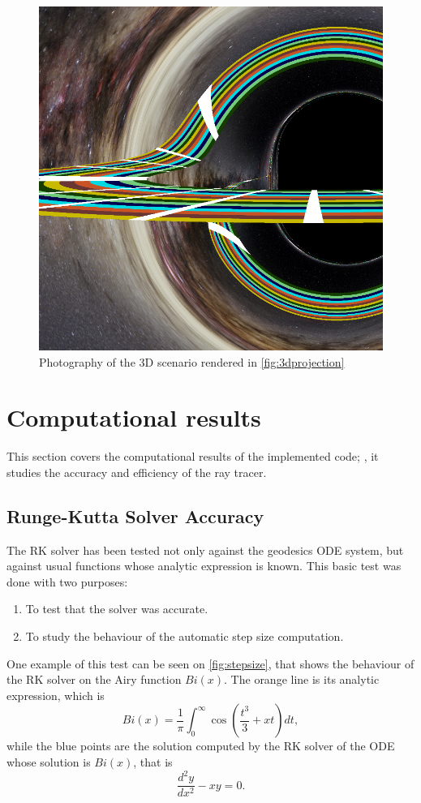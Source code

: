 \begin{figure}[bth]
	\myfloatalign
	\includegraphics[width=.7\linewidth]{gfx/3d_01_image}
	\caption[Photography from a 3D scenario]{Photography of the 3D scenario rendered in \autoref{fig:3dprojection}}
	\label{fig:3dprojectionimage}
\end{figure}

\section{Computational results}

This section covers the computational results of the implemented code; \ie, it studies the accuracy and efficiency of the ray tracer.

\subsection{Runge-Kutta Solver Accuracy}

The \ac{RK} solver has been tested not only against the geodesics \ac{ODE} system, but against usual functions whose analytic expression is known. This basic test was done with two purposes:
\begin{enumerate}
	\item To test that the solver was accurate.
	\item To study the behaviour of the automatic step size computation.
\end{enumerate}

One example of this test can be seen on \autoref{fig:stepsize}, that shows the behaviour of the \ac{RK} solver on the Airy function $Bi(x)$. The orange line is its analytic expression, which is
\[
	Bi(x) = \frac{1}{\pi} \int_0^\infty \cos\left(\frac{t^3}{3} + xt\right)dt,
\]
while the blue points are the solution computed by the \ac{RK} solver of the \ac{ODE} whose solution is $Bi(x)$, that is
\[
	\frac{d^2y}{dx^2} - xy = 0.
\]

